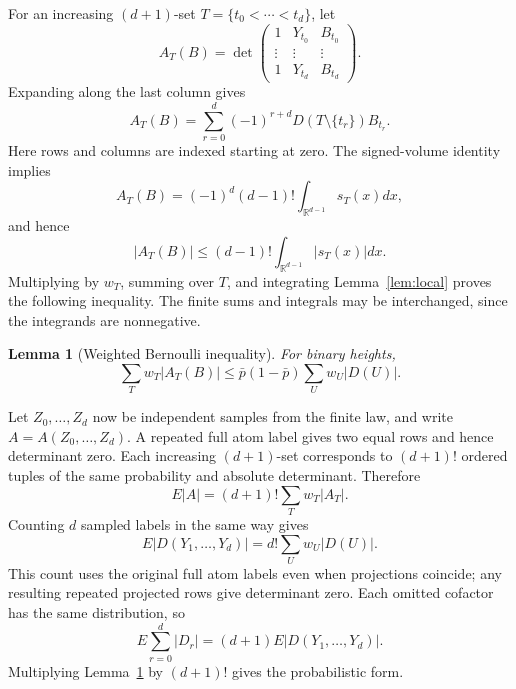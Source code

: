 \documentclass[11pt]{article}
\newtheorem{lemma}[theorem]{Lemma}
\theoremstyle{remark}
\newcommand{\R}{\mathbb{R}}
\newcommand{\E}{E}
\begin{document}
\begin{aiblock}

For an increasing $(d+1)$-set $T=\{t_0<\cdots<t_d\}$, let
\begin{equation}
A_T(B)=\det\begin{pmatrix}
1&Y_{t_0}&B_{t_0}\\
\vdots&\vdots&\vdots\\
1&Y_{t_d}&B_{t_d}
\end{pmatrix}.
\end{equation}
Expanding along the last column gives
\begin{equation}
A_T(B)=\sum_{r=0}^d(-1)^{r+d}D(T\setminus\{t_r\})B_{t_r}.
\end{equation}
Here rows and columns are indexed starting at zero. The signed-volume
identity implies
\begin{equation}
A_T(B)=(-1)^d(d-1)!\int_{\R^{d-1}}s_T(x)dx,
\end{equation}
and hence
\begin{equation}
|A_T(B)|\leq(d-1)!\int_{\R^{d-1}}|s_T(x)|dx.
\end{equation}
Multiplying by $w_T$, summing over $T$, and integrating
Lemma~\ref{lem:local} proves the following inequality. The finite sums
and integrals may be interchanged, since the integrands are nonnegative.

\begin{lemma}[Weighted Bernoulli inequality]
\label{lem:weighted}
For binary heights,
\begin{equation}
\sum_Tw_T|A_T(B)|\leq\bar p(1-\bar p)\sum_Uw_U|D(U)|.
\end{equation}
\end{lemma}

Let $Z_0,\ldots,Z_d$ now be independent samples from the finite law, and
write $A=A(Z_0,\ldots,Z_d)$. A repeated full atom label gives two equal
rows and hence determinant zero. Each increasing $(d+1)$-set corresponds
to $(d+1)!$ ordered tuples of the same probability and absolute
determinant. Therefore
\begin{equation}
\E|A|=(d+1)!\sum_Tw_T|A_T|.
\end{equation}
Counting $d$ sampled labels in the same way gives
\begin{equation}
\E|D(Y_1,\ldots,Y_d)|=d!\sum_Uw_U|D(U)|.
\end{equation}
This count uses the original full atom labels even when projections
coincide; any resulting repeated projected rows give determinant zero.
Each omitted cofactor has the same distribution, so
\begin{equation}
\E\sum_{r=0}^d|D_r|=(d+1)\E|D(Y_1,\ldots,Y_d)|.
\end{equation}
Multiplying Lemma~\ref{lem:weighted} by $(d+1)!$ gives the probabilistic
form.


\end{aiblock}
\end{document}
